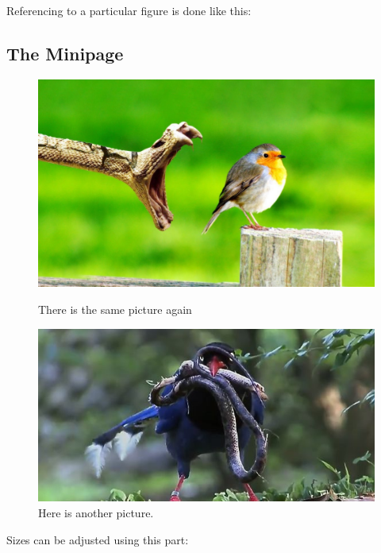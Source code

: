 Referencing to a particular figure is done like this:



\subsection{The Minipage}

\begin{figure} [h]
\begin{minipage}[t]{0.45\textwidth}
\centering
\includegraphics[width=1\textwidth]{Pictures/Example.jpg}
\caption{There is the same picture again}
\label{Bird2}
\end{minipage}
\hspace{0.1\textwidth}
\begin{minipage}[t]{0.45\textwidth}
\centering
\includegraphics[width=1\textwidth]{Pictures/Example2.jpg}
\caption{Here is another picture.}
\label{Bird3}
\end{minipage}
\end{figure}

Sizes can be adjusted using this part: %

